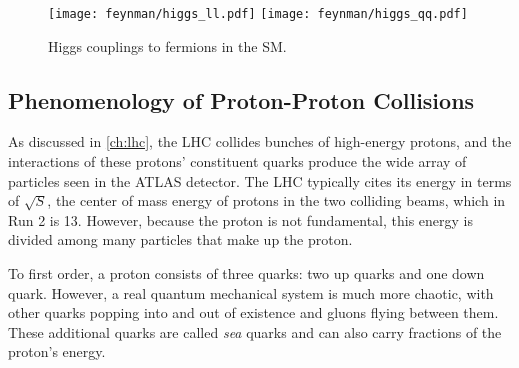  \begin{centering}
\begin{figure}[!hbt]
\myfloatalign
\texttt{[image: feynman/higgs\_ll.pdf]}
\texttt{[image: feynman/higgs\_qq.pdf]}
\caption{Higgs couplings to fermions in the \ac{SM}.}
\label{fig:higgs_fermion}
\end{figure}
\end{centering}






\subsection{Phenomenology of Proton-Proton Collisions}
\label{sec:pp_collisions}

As discussed in \autoref{ch:lhc}, the \ac{LHC} collides bunches of high-energy protons, and the interactions of these protons' constituent quarks produce the wide array of particles seen in the ATLAS detector. The \ac{LHC} typically cites its energy in terms of $\sqrt{S}$, the center of mass energy of protons in the two colliding beams, which in Run 2 is 13\tev. However, because the proton is not fundamental, this energy is divided among many particles that make up the proton. 

To first order, a proton consists of three quarks: two up quarks and one down quark. However, a real quantum mechanical system is much more chaotic, with other quarks popping into and out of existence and gluons flying between them. These additional quarks are called \textit{sea} quarks and can also carry fractions of the proton's energy.

